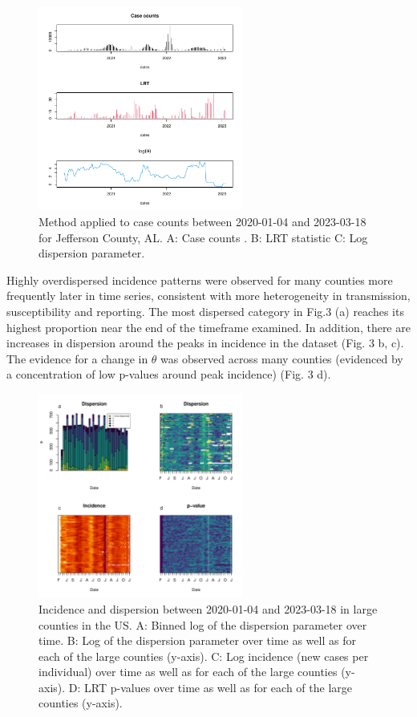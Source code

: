 \documentclass[10pt,letterpaper]{article}
\begin{document}
\begin{figure}[!h]
\includegraphics[width=0.6\textwidth]{compare.pdf}
\caption{Method applied to case counts between 2020-01-04 and 2023-03-18
for Jefferson County, AL. A: Case counts . B: LRT statistic C: Log dispersion
parameter.
}
\label{fig2}
\end{figure}

\noindent Highly overdispersed incidence patterns were observed for many counties more frequently later in time series, consistent with more heterogeneity in transmission, susceptibility and reporting. 
The most dispersed category in Fig.3 (a) reaches its highest proportion near the end of the timeframe examined.
In addition, there are increases in dispersion around the peaks in incidence in the dataset (Fig. 3 b, c).
The evidence for a change in \begin{math}\theta\end{math} was observed across many counties (evidenced by a concentration of low p-values around peak incidence) (Fig. 3 d).

\begin{figure}[!h]
\includegraphics[width=0.6\textwidth]{fig2}
\caption{
Incidence and dispersion between 2020-01-04 and 2023-03-18 in large counties in the US. A: Binned log of the dispersion parameter over time. B: Log of the dispersion parameter over time as well as for each of the large counties (y-axis). C: Log incidence (new cases per individual) over time as well as for each of the large counties (y-axis). D: LRT p-values over time as well as for each of the large counties (y-axis).
}
\label{fig2}
\end{figure}
\end{document}
